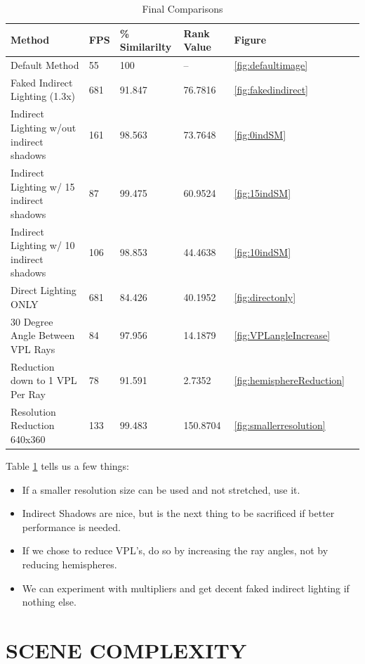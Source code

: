 \begin{table}[h!]
	\caption{Final Comparisons}
	\begin{center}
	    \begin{tabular}{ | l | l | l | l | l | l |}
	    \hline
	    Method & FPS & \% Similarilty & Rank Value & Figure\\ \hline
	    Default Method & 55 & 100 & -- & \ref{fig:defaultimage}\\ \hline
	    Faked Indirect Lighting (1.3x) & 681 & 91.847 & 76.7816 & \ref{fig:fakedindirect}\\ \hline
	    Indirect Lighting w/out indirect shadows & 161 & 98.563 & 73.7648 & \ref{fig:0indSM}\\ \hline
	    Indirect Lighting w/ 15 indirect shadows & 87 & 99.475 & 60.9524 & \ref{fig:15indSM}\\ \hline
	    Indirect Lighting w/ 10 indirect shadows & 106 & 98.853 & 44.4638 & \ref{fig:10indSM}\\ \hline
	    Direct Lighting ONLY & 681 & 84.426 & 40.1952 & \ref{fig:directonly}\\ \hline
	    30 Degree Angle Between VPL Rays & 84 & 97.956 & 14.1879 & \ref{fig:VPLangleIncrease}\\ \hline
	    Reduction down to 1 VPL Per Ray & 78 & 91.591 & 2.7352 & \ref{fig:hemisphereReduction}\\ \hline
	    Resolution Reduction 640x360 & 133 & 99.483 & 150.8704 & \ref{fig:smallerresolution}\\ \hline
	    \end{tabular}
	\end{center}
	\label{table:5.10}
\end{table}

Table \ref{table:5.10} tells us a few things:
\begin{itemize}
\item If a smaller resolution size can be used and not stretched, use it.
\item Indirect Shadows are nice, but is the next thing to be sacrificed if better performance is needed.
\item If we chose to reduce VPL's, do so by increasing the ray angles, not by reducing hemispheres.
\item We can experiment with multipliers and get decent faked indirect lighting if nothing else.
\end{itemize}

\section{SCENE COMPLEXITY}
